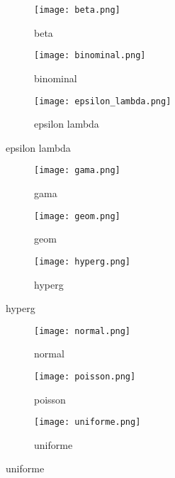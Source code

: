 \begin{figure}[h]
\begin{subfigure}{0.3\textwidth}
\texttt{[image: beta.png]}
\caption{beta}
\end{subfigure}
\begin{subfigure}{0.3\textwidth}
    \texttt{[image: binominal.png]}
    \caption{binominal}
\end{subfigure}
\begin{subfigure}{0.3\textwidth}
    \texttt{[image: epsilon\_lambda.png]}
    \caption{epsilon lambda}
\end{subfigure}
\end{figure}
\begin{figure}[h]
\begin{subfigure}{0.3\textwidth}
    \texttt{[image: gama.png]}
    \caption{gama}
\end{subfigure}
\begin{subfigure}{0.3\textwidth}
    \texttt{[image: geom.png]}
    \caption{geom}
\end{subfigure}
\begin{subfigure}{0.3\textwidth}
    \texttt{[image: hyperg.png]}
    \caption{hyperg}
\end{subfigure}
\end{figure}
\begin{figure}[h]
\begin{subfigure}{0.3\textwidth}
    \texttt{[image: normal.png]}
    \caption{normal}
\end{subfigure}
\begin{subfigure}{0.3\textwidth}
    \texttt{[image: poisson.png]}
    \caption{poisson}
\end{subfigure}
\begin{subfigure}{0.3\textwidth}
    \texttt{[image: uniforme.png]}
    \caption{uniforme}
\end{subfigure}
\end{figure}